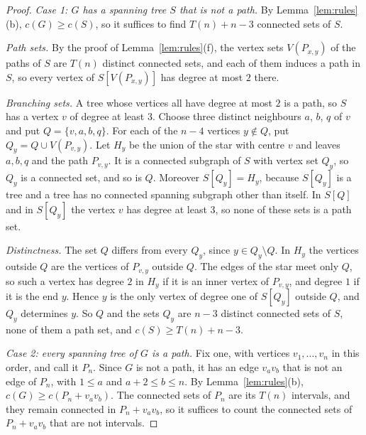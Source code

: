 \documentclass[11pt]{amsart}
\theoremstyle{definition}
\theoremstyle{remark}
\newcommand{\Tr}[1]{T(#1)}
\begin{document}
\begin{proof}
\emph{Case 1: $G$ has a spanning tree $S$ that is not a path.} By Lemma~\ref{lem:rules}(b), $c(G)\ge c(S)$, so it suffices to find $\Tr{n}+n-3$ connected sets of $S$.

\emph{Path sets.} By the proof of Lemma~\ref{lem:rules}(f), the vertex sets $V(P_{x,y})$ of the paths of $S$ are $\Tr{n}$ distinct connected sets, and each of them induces a path in $S$, so every vertex of $S[V(P_{x,y})]$ has degree at most $2$ there.

\emph{Branching sets.} A tree whose vertices all have degree at most $2$ is a path, so $S$ has a vertex $v$ of degree at least $3$. Choose three distinct neighbours $a$, $b$, $q$ of $v$ and put $Q=\{v,a,b,q\}$. For each of the $n-4$ vertices $y\notin Q$, put $Q_y=Q\cup V(P_{v,y})$. Let $H_y$ be the union of the star with centre $v$ and leaves $a,b,q$ and the path $P_{v,y}$. It is a connected subgraph of $S$ with vertex set $Q_y$, so $Q_y$ is a connected set, and so is $Q$. Moreover $S[Q_y]=H_y$, because $S[Q_y]$ is a tree and a tree has no connected spanning subgraph other than itself. In $S[Q]$ and in $S[Q_y]$ the vertex $v$ has degree at least $3$, so none of these sets is a path set.

\emph{Distinctness.} The set $Q$ differs from every $Q_y$, since $y\in Q_y\setminus Q$. In $H_y$ the vertices outside $Q$ are the vertices of $P_{v,y}$ outside $Q$. The edges of the star meet only $Q$, so such a vertex has degree $2$ in $H_y$ if it is an inner vertex of $P_{v,y}$, and degree $1$ if it is the end $y$. Hence $y$ is the only vertex of degree one of $S[Q_y]$ outside $Q$, and $Q_y$ determines $y$. So $Q$ and the sets $Q_y$ are $n-3$ distinct connected sets of $S$, none of them a path set, and $c(S)\ge\Tr{n}+n-3$.

\emph{Case 2: every spanning tree of $G$ is a path.} Fix one, with vertices $v_1,\dots,v_n$ in this order, and call it $P_n$. Since $G$ is not a path, it has an edge $v_av_b$ that is not an edge of $P_n$, with $1\le a$ and $a+2\le b\le n$. By Lemma~\ref{lem:rules}(b), $c(G)\ge c(P_n+v_av_b)$. The connected sets of $P_n$ are its $\Tr{n}$ intervals, and they remain connected in $P_n+v_av_b$, so it suffices to count the connected sets of $P_n+v_av_b$ that are not intervals.


\end{proof}
\end{document}
